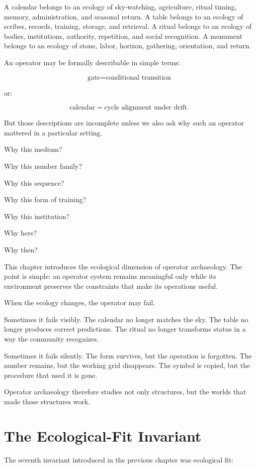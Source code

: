 \documentclass[11pt]{book}
\begin{document}
A calendar belongs to an ecology of sky-watching, agriculture, ritual timing, memory, administration, and seasonal return. A table belongs to an ecology of scribes, records, training, storage, and retrieval. A ritual belongs to an ecology of bodies, institutions, authority, repetition, and social recognition. A monument belongs to an ecology of stone, labor, horizon, gathering, orientation, and return.

An operator may be formally describable in simple terms:

\[
\text{gate} = \text{conditional transition}
\]

or:

\[
\text{calendar} = \text{cycle alignment under drift}.
\]

But those descriptions are incomplete unless we also ask why such an operator mattered in a particular setting.

Why this medium?

Why this number family?

Why this sequence?

Why this form of training?

Why this institution?

Why here?

Why then?

This chapter introduces the ecological dimension of operator archaeology. The point is simple: an operator system remains meaningful only while its environment preserves the constraints that make its operations useful.

When the ecology changes, the operator may fail.

Sometimes it fails visibly. The calendar no longer matches the sky. The table no longer produces correct predictions. The ritual no longer transforms status in a way the community recognizes.

Sometimes it fails silently. The form survives, but the operation is forgotten. The number remains, but the working grid disappears. The symbol is copied, but the procedure that used it is gone.

Operator archaeology therefore studies not only structures, but the worlds that made those structures work.

\section{The Ecological-Fit Invariant}

The seventh invariant introduced in the previous chapter was ecological fit:
\end{document}
